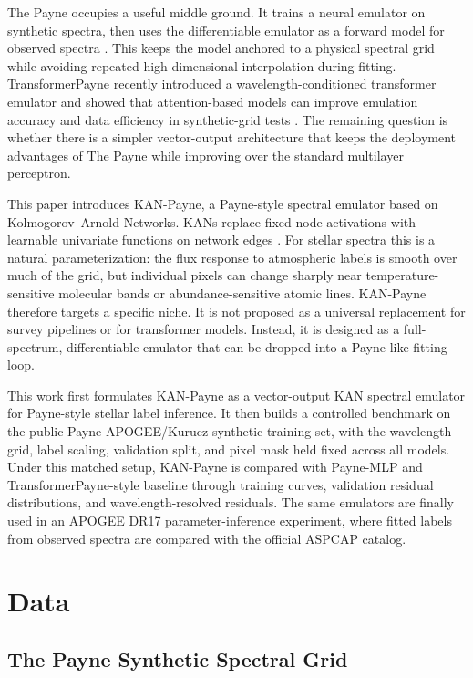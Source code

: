 \documentclass[universe,article,submit,pdftex,moreauthors]{Definitions/mdpi}
\begin{document}
The Payne occupies a useful middle ground. It trains a neural emulator on
synthetic spectra, then uses the differentiable emulator as a forward model for
observed spectra \cite{ting2019payne}. This keeps the model anchored to a
physical spectral grid while avoiding repeated high-dimensional interpolation
during fitting. TransformerPayne recently introduced a wavelength-conditioned
transformer emulator and showed that attention-based models can improve
emulation accuracy and data efficiency in synthetic-grid tests
\cite{rozanski2024transformerpayne}. The remaining question is whether there is
a simpler vector-output architecture that keeps the deployment advantages of
The Payne while improving over the standard multilayer perceptron.

This paper introduces KAN-Payne, a Payne-style spectral emulator based on
Kolmogorov--Arnold Networks. KANs replace fixed node activations with learnable
univariate functions on network edges \cite{liu2024kan}. For stellar spectra
this is a natural parameterization: the flux response to atmospheric labels is
smooth over much of the grid, but individual pixels can change sharply near
temperature-sensitive molecular bands or abundance-sensitive atomic lines.
KAN-Payne therefore targets a specific niche. It is not proposed as a universal
replacement for survey pipelines or for transformer models. Instead, it is
designed as a full-spectrum, differentiable emulator that can be dropped into a
Payne-like fitting loop.

This work first formulates KAN-Payne as a vector-output KAN spectral emulator
for Payne-style stellar label inference. It then builds a controlled benchmark
on the public Payne APOGEE/Kurucz synthetic training set, with the wavelength
grid, label scaling, validation split, and pixel mask held fixed across all
models. Under this matched setup, KAN-Payne is compared with Payne-MLP and
TransformerPayne-style baseline through training curves, validation residual
distributions, and wavelength-resolved residuals. The same emulators are
finally used in an APOGEE DR17 parameter-inference experiment, where fitted
labels from observed spectra are compared with the official ASPCAP catalog.

\section{Data}

\subsection{The Payne Synthetic Spectral Grid}
\end{document}

